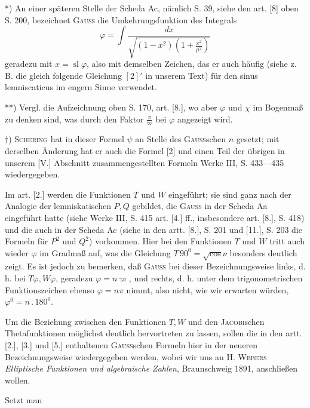 {\small
\par\indent **) An einer späteren Stelle der Scheda Ac, nämlich S. 39, siehe den art. [8] oben S. 200, bezeichnet \textsc{Gauss} die Umkehrungsfunktion des Integrals
\[\varphi=\int\frac{dx}{\sqrt{(1-x^2)\left(1+\frac{x^2}{\mu^2}\right)}}\]
\noindent geradezu mit $x=\operatorname{sl}\varphi$, also mit demselben Zeichen, das er auch häufig (siehe z. B. die gleich folgende Gleichung $[2]'$ in unserem Text) für den sinus lemniscaticus im engern Sinne verwendet.
\par\indent ***) Vergl. die Aufzeichnung oben S. 170, art. [8.], wo aber $\varphi$ und $\chi$ im Bogenmaß zu denken sind, was durch den Faktor $\frac\pi\varpi$ bei $\varphi$ angezeigt wird.
\par\indent $\dagger$) \textsc{Schering} hat in dieser Formel $\psi$ an Stelle des \textsc{Gauss}schen $n$ gesetzt; mit derselben Änderung hat er auch die Formel [2] und einen Teil der übrigen in unserem [V.] Abschnitt zusammengestellten Formeln Werke III, S. 433—435 wiedergegeben.
\par}
\clearpage
\fancyhead{}
\par\indent Im art. [2.] werden die Funktionen $T$ und $W$ eingeführt; sie sind ganz nach der Analogie der lemniskatischen $P,Q$ gebildet, die \textsc{Gauss} in der Scheda Aa eingeführt hatte (siehe Werke III, S. 415 art. [4.] ff., insbesondere art. [8.], S. 418) und die auch in der Scheda Ac (siehe in den artt. [8.], S. 201 und [11.], S. 203 die Formeln für $P^2$ und $Q^2$) vorkommen. Hier bei den Funktionen $T$ und $W$ tritt auch wieder $\varphi$ im Gradmaß auf, was die Gleichung $T\,90^0=\surd\cos\nu$ besonders deutlich zeigt. Es ist jedoch zu bemerken, daß \textsc{Gauss} bei dieser Bezeichnungsweise links, d. h. bei $T\varphi,W\varphi$, geradezu $\varphi=n\varpi$, und rechts, d. h. unter dem trigonometrischen Funktionszeichen ebenso $\varphi=n\pi$ nimmt, also nicht, wie wir erwarten würden, $\varphi^0=n\,.\,180^0$.
\par\indent Um die Beziehung zwischen den Funktionen $T,W$ und den \textsc{Jacobi}schen Thetafunktionen möglichst deutlich hervortreten zu lassen, sollen die in den artt. [2.], [3.] und [5.] enthaltenen \textsc{Gauss}schen Formeln hier in der neueren Bezeichnungsweise wiedergegeben werden, wobei wir uns an H. \textsc{Webers} \textit{Elliptische Funktionen und algebraische Zahlen}, Braunschweig 1891, anschließen wollen.
\par\indent Setzt man
